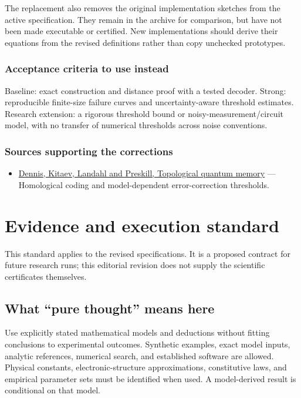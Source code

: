 \documentclass[
  11pt,
]{article}
\providecommand{\tightlist}{%
  \setlength{\itemsep}{0pt}\setlength{\parskip}{0pt}}
\begin{document}
The replacement also removes the original implementation sketches from
the active specification. They remain in the archive for comparison, but
have not been made executable or certified. New implementations should
derive their equations from the revised definitions rather than copy
unchecked prototypes.

\subsubsection{Acceptance criteria to use instead}

Baseline: exact construction and distance proof with a tested decoder.
Strong: reproducible finite-size failure curves and uncertainty-aware
threshold estimates. Research extension: a rigorous threshold bound or
noisy-measurement/circuit model, with no transfer of numerical
thresholds across noise conventions.

\subsubsection{Sources supporting the corrections}

\begin{itemize}
\tightlist
\item
  \href{https://arxiv.org/abs/quant-ph/0110143}{Dennis, Kitaev, Landahl
  and Preskill, Topological quantum memory} --- Homological coding and
  model-dependent error-correction thresholds.
\end{itemize}

\section{Evidence and execution standard}

This standard applies to the revised specifications. It is a proposed
contract for future research runs; this editorial revision does not
supply the scientific certificates themselves.

\subsection{What ``pure thought'' means here}

Use explicitly stated mathematical models and deductions without fitting
conclusions to experimental outcomes. Synthetic examples, exact model
inputs, analytic references, numerical search, and established software
are allowed. Physical constants, electronic-structure approximations,
constitutive laws, and empirical parameter sets must be identified when
used. A model-derived result is conditional on that model.
\end{document}
